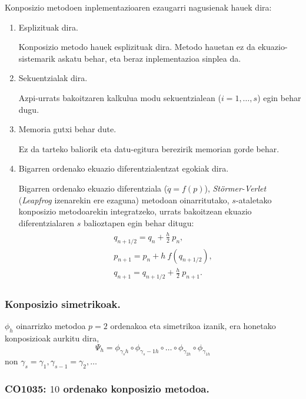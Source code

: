 Konposizio metodoen inplementazioaren ezaugarri nagusienak hauek dira:
\begin{enumerate}
\item{Esplizituak dira.}

Konposizio metodo hauek esplizituak dira. Metodo hauetan ez da ekuazio-sistemarik askatu behar, eta beraz inplementazioa sinplea da. 

\item{Sekuentzialak dira.}

Azpi-urrats bakoitzaren kalkulua modu sekuentzialean ($i=1,\dots,s$) egin behar dugu.

\item{Memoria gutxi behar dute.}

Ez da tarteko baliorik eta datu-egitura berezirik memorian gorde behar.   

\item{Bigarren ordenako ekuazio diferentzialentzat egokiak dira.}

Bigarren ordenako ekuazio diferentziala ($\ddot{q}=f(p)$), \emph{Störmer-Verlet} (\emph{Leapfrog} izenarekin ere ezaguna) metodoan oinarritutako, $s$-ataletako konposizio metodoarekin integratzeko, urrats bakoitzean ekuazio diferentzialaren $s$ balioztapen egin behar ditugu:
\begin{align}
\begin{split}
&q_{{n+1}/{2}}=q_n+\frac{h}{2} \ p_n,\\
&p_{n+1}=p_n+h \ f(q_{{n+1}/{2}}),\\
&q_{n+1}=q_{{n+1}/{2}}+\frac{h}{2} \ p_{n+1}.
\end{split}
\label{eq:stverlet}
\end{align}


\end{enumerate}

\subsubsection*{Konposizio simetrikoak.}

$\phi_h$ oinarrizko metodoa $p=2$ ordenakoa eta simetrikoa izanik, era honetako konposizioak aurkitu dira,
\begin{equation}
\Psi_h=\phi_{\gamma_s h} \circ \phi_{\gamma_s-1 h} \circ \dots \circ \phi_{\gamma_{2 h}} \circ \phi_{\gamma_{1 h}} 
\end{equation}
non $\gamma_s=\gamma_1, \gamma_{s-1}=\gamma_2,\dots$ 

\subsubsection*{CO1035: $10$ ordenako konposizio metodoa.}

